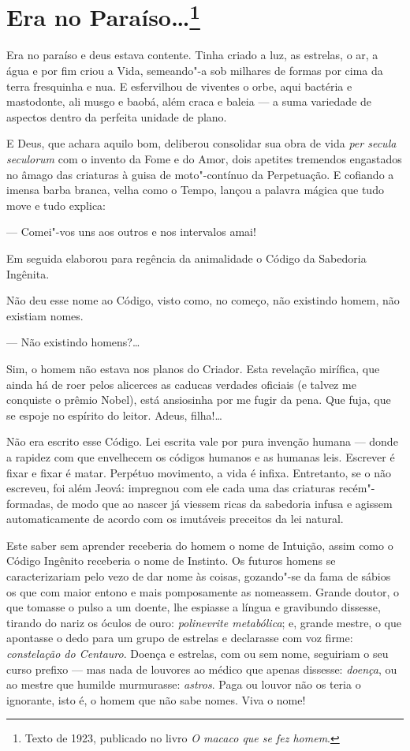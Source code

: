 \chapter{Era no Paraíso\ldots{}\footnote[*]{Texto de 1923, publicado no livro \emph{O macaco que se fez homem}.}}

Era no paraíso e deus estava contente. Tinha criado a luz, as estrelas,
o ar, a água e por fim criou a Vida, semeando"-a sob milhares de formas
por cima da terra fresquinha e nua. E esfervilhou de viventes o orbe,
aqui bactéria e mastodonte, ali musgo e baobá, além craca e baleia --- a
suma variedade de aspectos dentro da perfeita unidade de plano.

E Deus, que achara aquilo bom, deliberou consolidar sua obra de vida
\emph{per secula seculorum} com o invento da Fome e do Amor, dois
apetites tremendos engastados no âmago das criaturas à guisa de
moto"-contínuo da Perpetuação. E cofiando a imensa barba branca, velha
como o Tempo, lançou a palavra mágica que tudo move e tudo explica:

--- Comei"-vos uns aos outros e nos intervalos amai!

Em seguida elaborou para regência da animalidade o Código da Sabedoria
Ingênita.

Não deu esse nome ao Código, visto como, no começo, não existindo homem,
não existiam nomes.

--- Não existindo homens?\ldots{}

Sim, o homem não estava nos planos do Criador. Esta revelação mirífica,
que ainda há de roer pelos alicerces as caducas verdades oficiais (e
talvez me conquiste o prêmio Nobel), está ansiosinha por me fugir da
pena. Que fuja, que se espoje no espírito do leitor. Adeus, filha!\ldots{}

Não era escrito esse Código. Lei escrita vale por pura invenção humana
--- donde a rapidez com que envelhecem os códigos humanos e as humanas
leis. Escrever é fixar e fixar é matar. Perpétuo movimento, a vida é
infixa. Entretanto, se o não escreveu, foi além Jeová: impregnou com ele
cada uma das criaturas recém"-formadas, de modo que ao nascer já viessem
ricas da sabedoria infusa e agissem automaticamente de acordo com os
imutáveis preceitos da lei natural.

Este saber sem aprender receberia do homem o nome de Intuição, assim
como o Código Ingênito receberia o nome de Instinto. Os futuros homens
se caracterizariam pelo vezo de dar nome às coisas, gozando"-se da fama
de sábios os que com maior entono e mais pomposamente as nomeassem.
Grande doutor, o que tomasse o pulso a um doente, lhe espiasse a língua
e gravibundo dissesse, tirando do nariz os óculos de ouro:
\emph{polinevrite metabólica}; e, grande mestre, o que apontasse o dedo
para um grupo de estrelas e declarasse com voz firme: \emph{constelação
do Centauro}. Doença e estrelas, com ou sem nome, seguiriam o seu curso
prefixo --- mas nada de louvores ao médico que apenas dissesse:
\emph{doença}, ou ao mestre que humilde murmurasse: \emph{astros}. Paga
ou louvor não os teria o ignorante, isto é, o homem que não sabe nomes.
Viva o nome!


